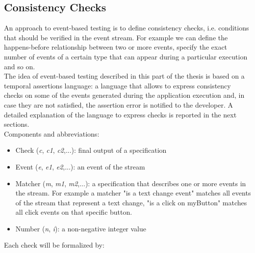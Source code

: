 \documentclass[11pt,a4paper,notitlepage]{article}
\begin{document}
\subsection{Consistency Checks}
An approach to event-based testing is to define consistency checks, i.e. conditions that should be verified in the event stream. For example we can define the happens-before relationship between two or more events, specify the exact number of events of a certain type that can appear during a particular execution and so on.\medskip \\
The idea of event-based testing described in this part of the thesis is based on a temporal assertions language: a language that allows to express consistency checks on some of the events generated during the application execution and, in case they are not satisfied, the assertion error is notified to the developer. A detailed explanation of the language to express checks is reported in the next sections.\bigskip \\
Components and abbreviations:
\begin{itemize}
	\item Check (\textit{c}, \textit{c1}, \textit{c2},...): final output of a specification
	\item Event (\textit{e}, \textit{e1}, \textit{e2},...): an event of the stream
	\item Matcher (\textit{m}, \textit{m1}, \textit{m2},...): a specification that describes one or more events in the stream. For example a matcher "is a text change event" matches all events of the stream that represent a text change, "is a click on myButton" matches all click events on that specific button.
	\item Number (\textit{n}, \textit{i}): a non-negative integer value
\end{itemize}\medskip
Each check will be formalized by:
\end{document}
